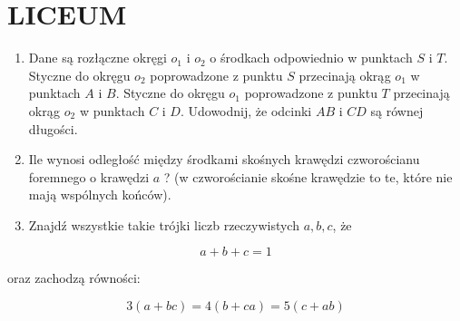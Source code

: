 \documentclass[10pt]{article}
\begin{document}
\section*{LICEUM}
\begin{enumerate}
  \item Dane są rozłączne okręgi \(o_{1}\) i \(o_{2}\) o środkach odpowiednio w punktach \(S\) i \(T\). Styczne do okręgu \(o_{2}\) poprowadzone z punktu \(S\) przecinają okrąg \(o_{1}\) w punktach \(A\) i \(B\). Styczne do okręgu \(o_{1}\) poprowadzone z punktu \(T\) przecinają okrąg \(o_{2}\) w punktach \(C\) i \(D\). Udowodnij, że odcinki \(A B\) i \(C D\) są równej długości.
  \item Ile wynosi odległość między środkami skośnych krawędzi czworościanu foremnego o krawędzi \(a\) ? (w czworościanie skośne krawędzie to te, które nie mają wspólnych końców).
  \item Znajdź wszystkie takie trójki liczb rzeczywistych \(a, b, c\), że
\end{enumerate}

\[
a+b+c=1
\]

oraz zachodzą równości:

\[
3(a+b c)=4(b+c a)=5(c+a b)
\]
\end{document}
